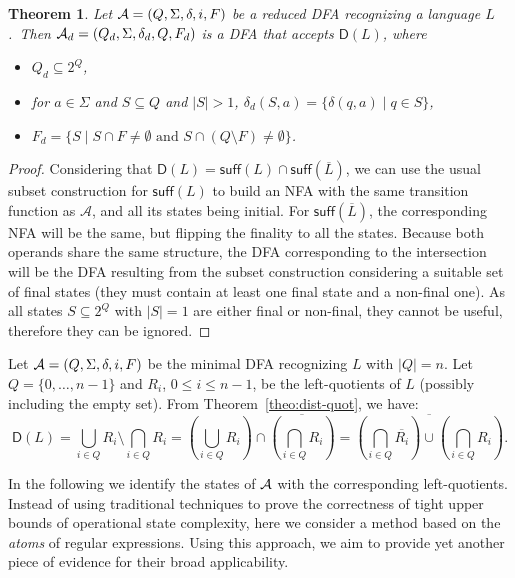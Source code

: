 \documentclass{article}
\newtheorem{theorem}{Theorem}
\newcommand{\dfa}{DFA\xspace}
\newcommand{\nfa}{NFA\xspace}
\newcommand{\comp}[1]{\overline{#1}}
\newcommand{\suff}[1]{\mathsf{suff}(#1)}
\newcommand{\dis}[1]{\mathsf{D}(#1)}
\begin{document}
\begin{theorem}
\label{theo:algodis}
  Let ${\cal A}=(Q,\Sigma,\delta,i,F)$ be a  reduced \dfa recognizing a language $L$.\ Then ${\cal A}_d=(Q_d,\Sigma,\delta_d,Q,F_d)$ is a \dfa that accepts $\dis{L}$, 
where 
\begin{itemize}
 \item $Q_d\subseteq 2^{Q}$, 
 \item for $a\in \Sigma$ and $S\subseteq Q$ and $|S|>1$, 
$\delta_d(S,a)=\{\delta(q,a)\mid q\in S\}$,
 \item $F_d=\{ S\mid S\cap F\not= \emptyset \text{ and }  S\cap (Q\setminus F)\not= \emptyset\}$.
\end{itemize}
\end{theorem}
\begin{proof}
Considering that $\dis{L}=\suff{L}\cap\suff{\comp{L}}$, we can use
the usual subset construction for $\suff{L}$ to build an \nfa
with the same transition function as $\mathcal{A}$, 
and all its states being initial. 
For $\suff{\comp{L}}$, the corresponding \nfa will be the same, 
but flipping the finality to all the states.  
Because both operands share the same structure,
the \dfa corresponding to the intersection
 will be the \dfa resulting from the subset construction 
 considering a suitable set of final states
(they must contain at least one final state and a non-final one). 
As all states $S\subseteq 2^Q$ with $|S|=1$ are either final or non-final, 
they cannot be useful, therefore they can be ignored.
\end{proof}

Let ${\cal A}=(Q,\Sigma,\delta,i,F)$ be the minimal \dfa recognizing
$L$ with $|Q|=n$. 
Let $Q=\{0,\ldots,n-1\}$ and $R_i $, $0\leq i\leq n-1$, be the
left-quotients of $L$ (possibly including the empty set). 
From  Theorem~\ref{theo:dist-quot}, we have:
  \begin{equation}
\label{eq:atoms}
    \dis{L}=\bigcup_{i\in Q}R_i  \setminus
    \bigcap_{i\in Q}R_i =\left(\bigcup_{i\in
        Q}R_i \right)\cap\comp{\left (\bigcap_{i\in 
          Q}R_i \right )} = \comp{\left(\bigcap_{i\in
          Q}\comp{R_i }\right)\cup \left (\bigcap_{i\in 
          Q}R_i \right )}. 
  \end{equation}

In the following we identify the states of ${\cal A}$ with the
corresponding left-quotients. 
Instead of using traditional techniques to prove the correctness of 
tight upper bounds of operational state complexity, 
here we consider a method based on the \emph{atoms} 
of regular expressions. 
Using this approach, we  aim to provide yet another piece of evidence for their
 broad applicability.
\end{document}
